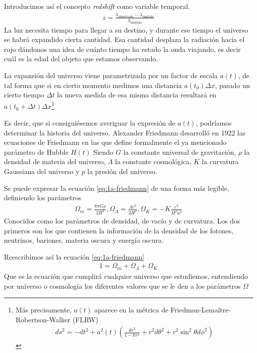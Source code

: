 Introducimos así el concepto \textit{redshift} como variable temporal.
\begin{align}
	z = \frac{\lambda_{\text{observado}} - \lambda_{\text{emitido}}}{\lambda_{\text{emitido}}}
	\label{eq:redshift}
\end{align}
La luz necesita tiempo para llegar a su destino, y durante ese tiempo el universo se habrá expandido cierta cantidad. Esa cantidad desplaza la radiación hacia el rojo dándonos una idea de cuánto tiempo ha estado la onda viajando, es decir cuál es la edad del objeto que estamos observando.

La expansión del universo viene parametrizada por un factor de escala $a(t)$, de tal forma que si en cierto momento medimos una distancia $a(t_0)\Delta x$, pasado un cierto tiempo $\Delta t$ la nueva medida de esa misma distancia resultará en $a(t_0+\Delta t) \Delta x$\footnote{Más precisamente, $a(t)$ aparece en la métrica de Friedman-Lemaître-Robertson-Walker (FLRW) 
\begin{align}
	ds^{2} = -dt ^{2} + a^{2}(t) \left( \frac{dr^{2}}{1-kr^2} + r^2d\theta^2 + r^2 \sin ^2 \theta d\phi^2\right) 
\end{align}}

Es decir, que si consiguiésemos averiguar la expresión de $a(t)$, podríamos determinar la historia del universo. Alexander Friedmann desarrolló en 1922 las ecuaciones de Friedmann en las que define formalmente el ya mencionado parámetro de Hubble $H(t)$
Siendo  $G$ la constante universal de gravitación, $\rho$ la densidad de materia del universo, $\Lambda$ la constante cosmológica, $K$ la curvatura Gaussiana del universo y  $p$ la presión del universo.

Se puede expresar la ecuación \eqref{eq:1a-friedmann} de una forma más legible, definiendo los parámetros 
\begin{align}
\Omega_m = \frac{8\pi G \rho}{3H^2}, \Omega_\Lambda = \frac{\Lambda c^2}{3H^2}, \Omega_K = -K\frac{c^2}{H^2a^2} 
\end{align}
Conocidos como los parámetros de densidad, de vacío y de curvatura. Los dos primeros son los que contienen la información de la densidad de los fotones, neutrinos, bariones, materia oscura y energía oscura.

Reescribimos así la ecuación \eqref{eq:1a-friedmann}
\begin{align}
	1 = \Omega_m + \Omega_\Lambda + \Omega_K
\end{align}
Que es la ecuación que cumplirá cualquier universo que estudiemos, entendiendo por universo o cosmología los diferentes valores que se le den a los parámetros $\Omega$

